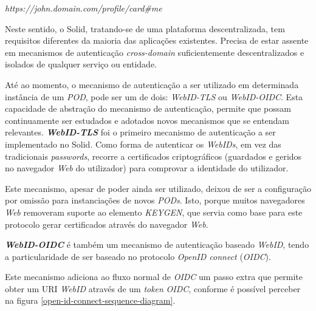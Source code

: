 \begin{center}
    \emph{https://john.domain.com/profile/card\#me}
\end{center}

Neste sentido, o Solid, tratando-se de uma plataforma descentralizada, tem requisitos diferentes da maioria das aplicações existentes. Precisa de estar assente em mecanismos de autenticação \emph{cross-domain} suficientemente descentralizados e isolados de qualquer serviço ou entidade\cite{solid_spec}.

Até ao momento, o mecanismo de autenticação a ser utilizado em determinada instância de um \emph{\acrshort{POD}}, pode ser um de dois: \emph{WebID-TLS} ou \emph{WebID-OIDC}. Esta capacidade de abstração do mecanismo de autenticação, permite que possam continuamente ser estudados e adotados novos mecanismos que se entendam relevantes\cite{solid_spec}.
\newpara
\textbf{\emph{WebID-TLS}} foi o primeiro mecanismo de autenticação a ser implementado no Solid. Como forma de autenticar os \emph{WebIDs}, em vez das tradicionais \emph{passwords}, recorre a certificados criptográficos (guardados e geridos no navegador \emph{Web} do utilizador) para comprovar a identidade do utilizador\cite{solid_webid-tls:}.

Este mecanismo, apesar de poder ainda ser utilizado, deixou de ser a configuração por omissão para instanciações de novos \emph{PODs}. Isto, porque muitos navegadores \emph{Web} removeram suporte ao elemento \emph{KEYGEN}, que servia como base para este protocolo gerar certificados através do navegador \emph{Web}\cite{solid_webid-tls:}.

\newpara
\textbf{\emph{WebID-OIDC}} é também um mecanismo de autenticação baseado \emph{WebID}, tendo a particularidade de ser baseado no protocolo \emph{OpenID connect} (\emph{OIDC}). 

Este mecanismo adiciona ao fluxo normal de \emph{OIDC} um passo extra que permite obter um URI \emph{WebID} através de um \emph{token} \emph{OIDC}\cite{solid_webid_oidc}, conforme é possível perceber na figura \ref{open-id-connect-sequence-diagram}.

